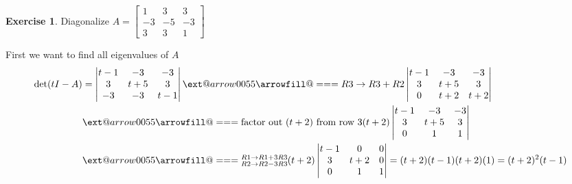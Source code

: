 \documentclass{beamer}
\makeatletter
\newcommand*{\Relbarfill@}{\arrowfill@\Relbar\Relbar\Relbar}
\newcommand*{\xequal}[2][]{\ext@arrow 0055\Relbarfill@{#1}{#2}}
\theoremstyle{definition}
\newtheorem{exercise}[theorem]{Exercise}
\theoremstyle{remark}
\makeatother
\begin{document}
\begin{frame}[t]
\begin{exercise}
Diagonalize $A = \begin{bmatrix}
1&3&3\\
-3&-5&-3\\
3&3&1
\end{bmatrix}$
\end{exercise}
\pause
\begin{solution}
First we want to find all eigenvalues of $A$
\begin{align*}
\det(tI-A)&=\left|\begin{matrix}
t-1&-3&-3\\
3&t+5&3\\
-3&-3&t-1
\end{matrix}\right|\xequal{R3\rightarrow R3+R2}\left|\begin{matrix}
t-1&-3&-3\\
3&t+5&3\\
0&t+2&t+2
\end{matrix}\right|\\
&\xequal{\text{factor out $(t+2)$ from row 3}}(t+2)\left|\begin{matrix}
t-1&-3&-3\\
3&t+5&3\\
0&1&1
\end{matrix}\right|\\
&\xequal{\substack{R1\rightarrow R1+3R3\\R2\rightarrow R2-3R3}}(t+2)\left|\begin{matrix}
t-1&0&0\\
3&t+2&0\\
0&1&1
\end{matrix}\right|=(t+2)(t-1)(t+2)(1)=(t+2)^2(t-1)
\end{align*}
\end{solution}
\end{frame}
\end{document}
